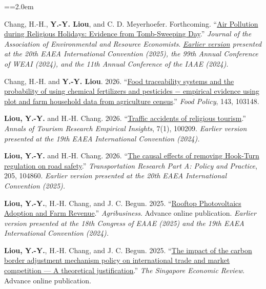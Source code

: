 \documentclass[11pt,letterpaper]{article}
\newenvironment{hanglist}{\par\setlength{\parindent}{0pt}\everypar={\hangindent=2.0em\hangafter=1}}{\par}
\begin{document}
\begin{hanglist}

Chang, H.-H., \textbf{Y.-Y. Liou}, and C. D.
Meyerhoefer. Forthcoming. ``\href{https://doi.org/10.1086/743452}{Air
Pollution during Religious Holidays: Evidence from Tomb-Sweeping Day}.''
\emph{Journal of the Association of Environmental and Resource
Economists}.
\newline \textit{\href{https://ssrn.com/abstract=4984614}{Earlier version} presented at the 20th EAEA International Convention (2025), the 99th Annual Conference of WEAI (2024), and the 11th Annual Conference of the IAAE (2024).}

Chang, H.-H. and \textbf{Y.-Y. Liou}. 2026.
``\href{https://doi.org/10.1016/j.foodpol.2026.103148}{Food traceability
systems and the probability of using chemical fertilizers and pesticides
− empirical evidence using plot and farm household data from agriculture
census}.'' \emph{Food Policy}, 143, 103148.

\textbf{Liou, Y.-Y.} and H.-H. Chang. 2026.
``\href{https://doi.org/10.1016/j.annale.2026.100209}{Traffic accidents
of religious tourism}.'' \emph{Annals of Tourism Research Empirical
Insights}, 7(1), 100209.
\newline \textit{Earlier version presented at the 19th EAEA International Convention (2024).}

\textbf{Liou, Y.-Y.} and H.-H. Chang. 2026.
``\href{https://doi.org/10.1016/j.tra.2026.104860}{The causal effects of
removing Hook-Turn regulation on road safety}.'' \emph{Transportation
Research Part A: Policy and Practice}, 205, 104860.
\newline \textit{Earlier version presented at the 20th EAEA International Convention (2025).}

\textbf{Liou, Y.-Y.}, H.-H. Chang, and J. C.
Begun. 2025.
``\href{https://onlinelibrary.wiley.com/doi/abs/10.1002/agr.70035}{Rooftop
Photovoltaics Adoption and Farm Revenue}.'' \emph{Agribusiness}. Advance
online publication.
\newline \textit{Earlier version presented at the 18th Congress of EAAE (2025) and the 19th EAEA International Convention (2024).}

\textbf{Liou, Y.-Y.}, H.-H. Chang, and J. C.
Begun. 2025.
``\href{https://www.worldscientific.com/doi/10.1142/S0217590825500328}{The
impact of the carbon border adjustment mechanism policy on international
trade and market competition --- A theoretical justification}.''
\emph{The Singapore Economic Review}. Advance online publication.


\end{hanglist}
\end{document}
